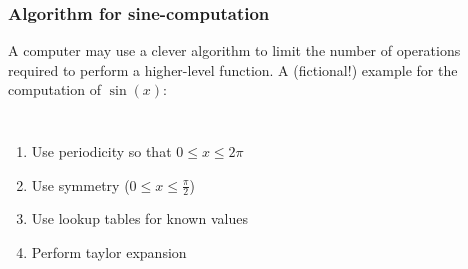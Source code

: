 \documentclass[11pt,table,final,fleqn,xcolor={usenames,dvipsnames}]{beamer}
\begin{document}
\begin{frame}
  \frametitle{Algorithm for sine-computation}
  A computer may use a clever algorithm to limit the number of operations required to perform a higher-level function. A (fictional!) example for the computation of $\sin(x)$:\\
  \begin{columns}
    \begin{enumerate}[<+->]
      \item<2-> Use periodicity so that $0 \leq x \leq 2\pi$
      \item<3-> Use symmetry ($0\leq x \leq \frac{\pi}{2}$)
      \item<4-> Use lookup tables for known values
      \item<5-> Perform taylor expansion
    \end{enumerate}


\end{columns}
\end{frame}
\end{document}
